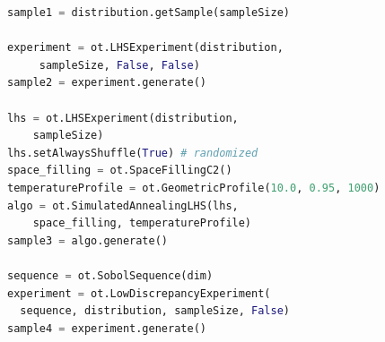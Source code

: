 \documentclass[aspectratio=169]{beamer}
\begin{document}
\begin{frame}[containsverbatim]
{\begin{columns}
\begin{lstlisting}[language=Python, numbers = none]
sample1 = distribution.getSample(sampleSize)

experiment = ot.LHSExperiment(distribution,
	 sampleSize, False, False)
sample2 = experiment.generate()

lhs = ot.LHSExperiment(distribution, 
	sampleSize)
lhs.setAlwaysShuffle(True) # randomized
space_filling = ot.SpaceFillingC2()
temperatureProfile = ot.GeometricProfile(10.0, 0.95, 1000)
algo = ot.SimulatedAnnealingLHS(lhs, 
	space_filling, temperatureProfile)
sample3 = algo.generate()

sequence = ot.SobolSequence(dim)
experiment = ot.LowDiscrepancyExperiment(
  sequence, distribution, sampleSize, False)
sample4 = experiment.generate()

\end{lstlisting}
	
\end{columns}

}

\end{frame}



\end{document}
